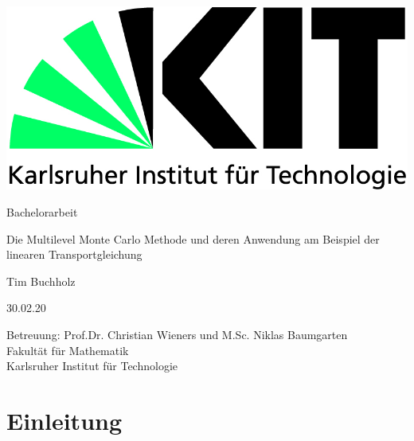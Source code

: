 \documentclass[12pt,a4paper]{scrartcl}
\theoremstyle{definition}
\numberwithin{equation}{section}
\begin{document}
  \pagestyle{empty}
  
  
  \begin{titlepage}

    \includegraphics[scale=0.45]{kit-logo.jpg} 
    \vspace*{2cm} 

 \begin{center} \large 
    
    Bachelorarbeit
    \vspace*{2cm}

    {\huge Die Multilevel Monte Carlo Methode und deren Anwendung am Beispiel der linearen Transportgleichung}
    \vspace*{2.5cm}

    Tim Buchholz
    \vspace*{1.5cm}

    30.02.20
    \vspace*{4.5cm}


    Betreuung: Prof.Dr. Christian Wieners und M.Sc. Niklas Baumgarten \\[1cm]
    Fakultät für Mathematik \\[1cm]
		Karlsruher Institut für Technologie
  \end{center}
\end{titlepage}



  \tableofcontents

\newpage
 


  \pagestyle{headings}

\section{Einleitung}

%
\end{document}
